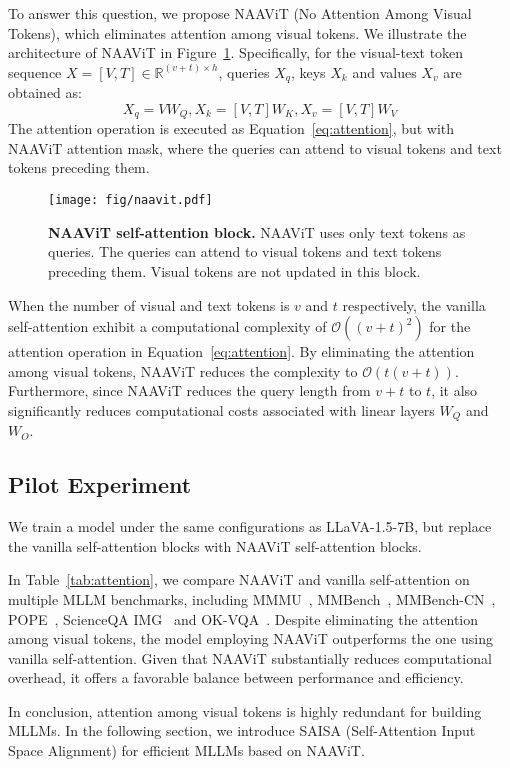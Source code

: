 To answer this question, we propose NAAViT (No Attention Among Visual Tokens), which eliminates attention among visual tokens.
We illustrate the architecture of NAAViT in Figure~\ref{fig:naavit}.
Specifically, for the visual-text token sequence $X=[V,T]\in \mathbb{R}^{(v+t) \times h}$, queries $X_q$, keys $X_k$ and values $X_v$ are obtained as:
\begin{equation}
X_q=VW_Q, X_k=[V,T]W_K, X_v=[V,T]W_V
\end{equation}
The attention operation is executed as Equation~\ref{eq:attention}, but with NAAViT attention mask, where the queries can attend to visual tokens and text tokens preceding them.

\begin{figure}[t]
  \centering
    \texttt{[image: fig/naavit.pdf]}
    \vspace{-0.1cm}
   \caption{\textbf{NAAViT self-attention block.} NAAViT uses only text tokens as queries. The queries can attend to visual tokens and text tokens preceding them. Visual tokens are not updated in this block.}
   \label{fig:naavit}
\end{figure}

When the number of visual and text tokens is $v$ and $t$ respectively, the vanilla self-attention exhibit a computational complexity of $\mathcal{O}((v+t)^2)$ for the attention operation in Equation~\ref{eq:attention}.
By eliminating the attention among visual tokens, NAAViT reduces the complexity to $\mathcal{O}(t(v+t))$.
Furthermore, since NAAViT reduces the query length from $v+t$ to $t$, it also significantly reduces computational costs associated with linear layers $W_Q$ and $W_O$.



\subsection{Pilot Experiment}
We train a model under the same configurations as LLaVA-1.5-7B, but replace the vanilla self-attention blocks with NAAViT self-attention blocks.

In Table~\ref{tab:attention}, we compare NAAViT and vanilla self-attention on multiple MLLM benchmarks, including MMMU~\cite{yue2024mmmumassivemultidisciplinemultimodal}, 
MMBench~\cite{liu2024mmbenchmultimodalmodelallaround}, MMBench-CN~\cite{liu2024mmbenchmultimodalmodelallaround}, POPE~\cite{li2023evaluatingobjecthallucinationlarge}, ScienceQA IMG~\cite{lu2022learnexplainmultimodalreasoning} and OK-VQA~\cite{marino2019okvqavisualquestionanswering}.
Despite eliminating the attention among visual tokens, the model employing NAAViT outperforms the one using vanilla self-attention. 
Given that NAAViT substantially reduces computational overhead, it offers a favorable balance between performance and efficiency.

In conclusion, attention among visual tokens is highly redundant for building MLLMs.
In the following section, we introduce SAISA (Self-Attention Input Space Alignment) for efficient MLLMs based on NAAViT.